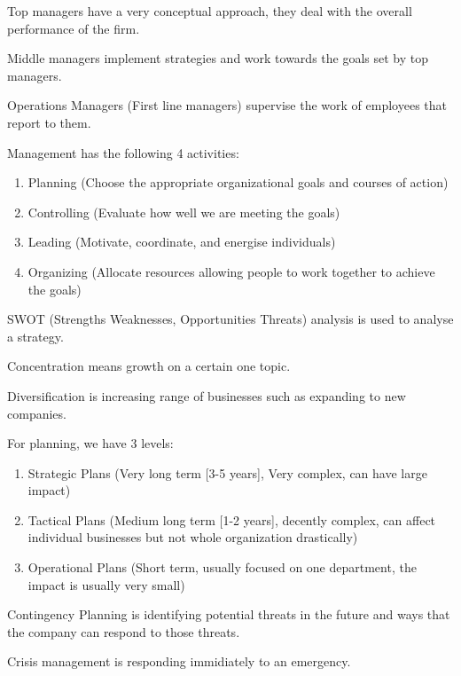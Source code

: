 \documentclass[12pt,letterpaper]{article} \usepackage{amsmath} \usepackage{graphicx} \usepackage[margin=1in]{geometry} \usepackage{longtable}  \usepackage{amssymb}
\begin{document}
		Top managers have a very conceptual approach, they deal with the overall performance of the firm.
		
		Middle managers implement strategies and work towards the goals set by top managers.
		
		Operations Managers (First line managers) supervise the work of employees that report to them.
		
		Management has the following 4 activities:
		\begin{enumerate}[noitemsep]
			\item Planning (Choose the appropriate organizational goals and courses of action)
			\item Controlling (Evaluate how well we are meeting the goals)
			\item Leading (Motivate, coordinate, and energise individuals)
			\item Organizing (Allocate resources allowing people to work together to achieve the goals)
		\end{enumerate}
	
		SWOT (Strengths Weaknesses, Opportunities Threats) analysis is used to analyse a strategy.
		
		Concentration means growth on a certain one topic. 
		
		Diversification is increasing range of businesses such as expanding to new companies. 
		
		For planning, we have 3 levels:
		\begin{enumerate}[noitemsep]
			\item Strategic Plans (Very long term [3-5 years], Very complex, can have large impact)
			\item Tactical Plans (Medium long term [1-2 years], decently complex, can affect individual businesses but not whole organization drastically)
			\item Operational Plans (Short term, usually focused on one department, the impact is usually very small)
		\end{enumerate}
	
		Contingency Planning is identifying potential threats in the future and ways that the company can respond to those threats.
		
		Crisis management is responding immidiately to an emergency.
	
\end{document}
